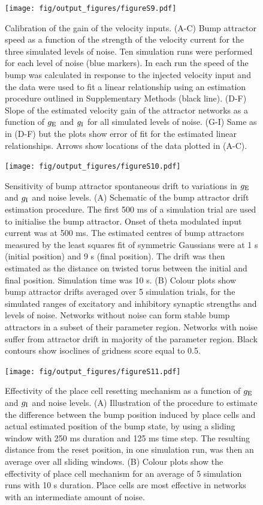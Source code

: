 \documentclass[a4paper,12pt]{article}
\newcommand{\ssc}[3]{\ensuremath{#1_{\text{#2}_{\text{#3}}}}}
\newcommand{\gE      }{\ssc{g}      {\scriptsize{E}}{}}
\newcommand{\gI      }{\ssc{g}      {\scriptsize{I}}{}}
\begin{document}
\clearpage

\begin{figure}[ht!]
    \centering
        \texttt{[image: fig/output\_figures/figureS9.pdf]}
    \caption{Calibration of the gain of the velocity inputs. (A-C) Bump
    attractor speed as a function of the strength of the velocity current for
    the three simulated levels of noise. Ten simulation runs were performed for
    each level of noise (blue markers). In each run the speed of the bump was
    calculated in response to the injected velocity input and the data were
    used to fit a linear relationship using an estimation procedure outlined
    in Supplementary Methods (black line). (D-F) Slope of the estimated velocity gain of
    the attractor networks as a function of $\gE$ and $\gI$ for all simulated
    levels of noise. (G-I) Same as in (D-F) but the plots show error of fit
    for the estimated linear relationships. Arrows show locations of the data
    plotted in (A-C).}
\end{figure}

\clearpage

\begin{figure}[ht!]
    \centering
        \texttt{[image: fig/output\_figures/figureS10.pdf]}
    \caption{Sensitivity of bump attractor spontaneous drift to
    variations in $\gE$ and $\gI$ and noise levels. (A) Schematic
    of the bump attractor drift estimation procedure. The first 500 ms of a
    simulation trial are used to initialise the bump attractor. Onset of theta
    modulated input current was at 500 ms. The estimated centres of bump
    attractors measured by the least squares fit of symmetric Gaussians were at
    1 s (initial position) and 9 s (final position). The drift was then
    estimated as the distance on twisted torus between the initial and final
    position. Simulation time was 10 s. (B) Colour plots show bump
    attractor drifts averaged over 5 simulation trials, for the simulated
    ranges of excitatory and inhibitory synaptic strengths and levels of noise.
    Networks without noise can form stable bump attractors in a subset of
    their parameter region. Networks with noise suffer from attractor drift in
    majority of the parameter region. Black contours show isoclines of gridness
    score equal to 0.5.}
\end{figure}

\clearpage

\begin{figure}[ht!]
    \centering
        \texttt{[image: fig/output\_figures/figureS11.pdf]}
    \caption{Effectivity of the place cell resetting mechanism as a function of
    $\gE$ and $\gI$ and noise levels. (A) Illustration of the procedure to
    estimate the difference between the bump position induced by place cells
    and actual estimated position of the bump state, by using a sliding window
    with 250 ms duration and 125 ms time step. The resulting distance from the
    reset position, in one simulation run, was then an average over all sliding
    windows. (B) Colour plots show the effectivity of place cell mechanism for
    an average of 5 simulation runs with 10 s duration. Place cells are most
    effective in networks with an intermediate amount of noise.}
    \label{fig:S_pc_effectivity}
\end{figure}
\end{document}
